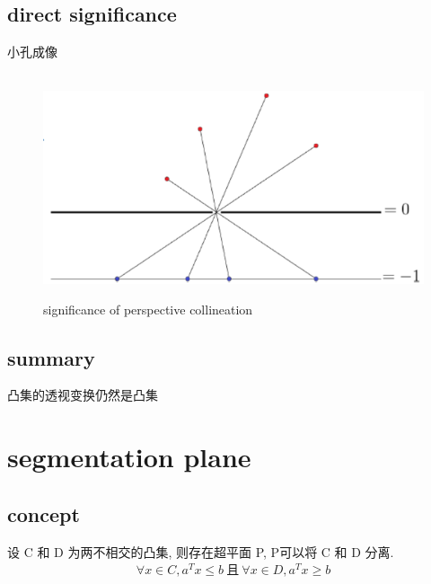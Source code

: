 \documentclass[oneside, 12pt]{ctexbook}
\begin{document}
			\subsection{\quad direct significance}
				小孔成像
				\begin{figure}[H]
					\vspace{-0.2cm}  %
					\setlength{\abovecaptionskip}{-0.2cm}   %
					\centering
					\includegraphics[scale=0.6]{perspective_collineation.png}
					\renewcommand{\figurename}{Fig} %
					\caption{significance of perspective collineation}
					\label{fig:2}
				\end{figure}
			
			\subsection{\quad summary}
				凸集的透视变换仍然是凸集
				
		\section{\quad segmentation plane}
			\subsection{\quad concept}
				设 C 和 D 为两不相交的凸集, 则存在超平面 P, P可以将 C 和 D 分离.
				\begin{align}
					\forall x \in C, a^T x \leq b \ \text{且} \ \forall x \in D, a^T x \geq b
				\end{align}
				
\end{document}
